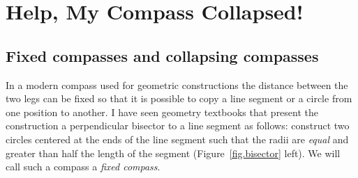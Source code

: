 
\chapter{Help, My Compass Collapsed!}\label{c.collapse}

\section{Fixed compasses and collapsing compasses}

In a modern compass used for geometric constructions the distance between the two legs can be fixed so that it is possible to copy a line segment or a circle from one position to another. I have seen geometry textbooks that present the  construction a perpendicular bisector to a line segment as follows: construct two circles centered at the ends of the line segment such that the radii are \emph{equal} and greater than half the length of the segment (Figure~\ref{fig.bisector} left). We will call such a compass a \emph{fixed compass}.

